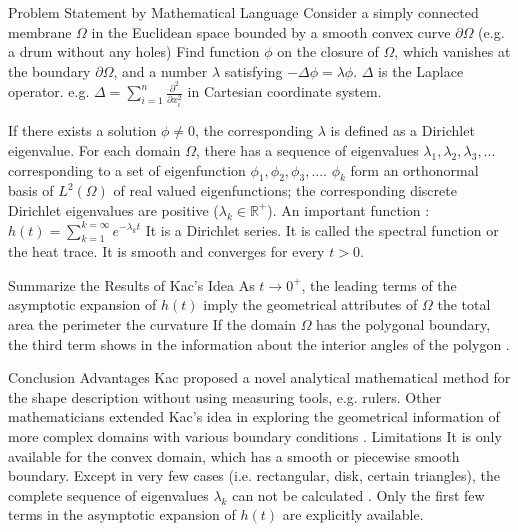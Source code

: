 \documentclass{article}
\begin{document}
\begin{outline}[enumerate]
    \2 Problem Statement by Mathematical Language
      \3 Consider a simply connected membrane $\Omega$ in the Euclidean space bounded by a smooth convex curve $\partial \Omega$ (e.g. a drum without any holes)
      \3 Find function $\phi$ on the closure of $\Omega$, which vanishes at the boundary $\partial \Omega$, and a number $\lambda$ satisfying $-\Delta \phi = \lambda \phi$.
        \4 $\Delta$ is the Laplace operator. e.g. $\Delta = \sum_{i=1}^{n} \frac{\partial ^2}{\partial x_i^2}$ in Cartesian coordinate system.
        
        \4 If there exists a solution $\phi \neq 0$, the corresponding $\lambda$ is defined as a Dirichlet eigenvalue.
        \4 For each domain $\Omega$, there has a sequence of eigenvalues $\lambda_1, \lambda_2, \lambda_3, ... $ corresponding to a set of eigenfunction $\phi_1, \phi_2, \phi_3, ...$.
        \4 $\phi_k$ form an orthonormal basis of $L^2(\Omega)$ of real valued eigenfunctions; the corresponding discrete Dirichlet eigenvalues are positive ($\lambda_k \in \mathbb{R^{+}}$).
      \3 An important function \cite{grieser2013hearing}: $h(t) = \sum_{k=1}^{k=\infty} e^{-\lambda_kt}$
        \4 It is a Dirichlet series.
        \4 It is called the spectral function or the heat trace.
        \4 It is smooth and converges for every $t>0$.
        
    \2 Summarize the Results of Kac's Idea
      \3 As $t \rightarrow 0^{+}$, the leading terms of the asymptotic expansion of $h(t)$ imply the geometrical attributes of $\Omega$
        \4 the total area
        \4 the perimeter
        \4 the curvature
      \3 If the domain $\Omega$ has the polygonal boundary, the third term shows in the information about the interior angles of the polygon \cite{grieser2013hearing}.

   \2 Conclusion
      \3 Advantages
        \4 Kac proposed a novel analytical mathematical method for the shape description without using measuring tools, e.g. rulers.
        \4 Other mathematicians extended Kac's idea in exploring the geometrical information of more complex domains with various boundary conditions \cite{khabou2007shape}\cite{gottlieb1985eigenvalues}\cite{gottlieb1983hearing} \cite{zayed1989heat}\cite{sleeman1984trace}.  
     \3 Limitations
        \4 It is only available for the convex domain, which has a smooth or piecewise smooth boundary.  
        \4 Except in very few cases (i.e. rectangular, disk, certain triangles), the complete sequence of eigenvalues $\lambda_k$ can not be calculated \cite{grieser2013hearing}.
        \4 Only the first few terms in the asymptotic expansion of $h(t)$ are explicitly available.


\end{outline}
\end{document}
